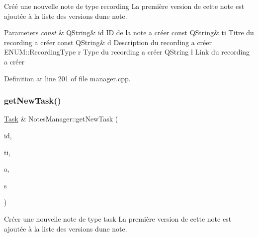 Créé une nouvelle note de type recording La première version de cette note est ajoutée à la liste des versions d\textquotesingle{}une note. 


\begin{DoxyParams}{Parameters}
{\em const} & Q\+String\& id ID de la note a créer const Q\+String\& ti Titre du recording a créer const Q\+String\& d Description du recording a créer E\+N\+U\+M\+::\+Recording\+Type r Type du recording a créer Q\+String l Link du recording a créer \\
\hline
\end{DoxyParams}


Definition at line 201 of file manager.\+cpp.

\mbox{\label{class_notes_manager_a39562bf5aef0d7a113317c1421d578fd}} 
\subsubsection{\texorpdfstring{get\+New\+Task()}{getNewTask()}}
{\footnotesize\ttfamily \hyperlink{class_task}{Task} \& Notes\+Manager\+::get\+New\+Task (\begin{DoxyParamCaption}\item[{const Q\+String \&}]{id,  }\item[{const Q\+String \&}]{ti,  }\item[{const Q\+String \&}]{a,  }\item[{E\+N\+U\+M\+::\+Status\+Type}]{s }\end{DoxyParamCaption})}



Créer une nouvelle note de type task La première version de cette note est ajoutée à la liste des versions d\textquotesingle{}une note. 


